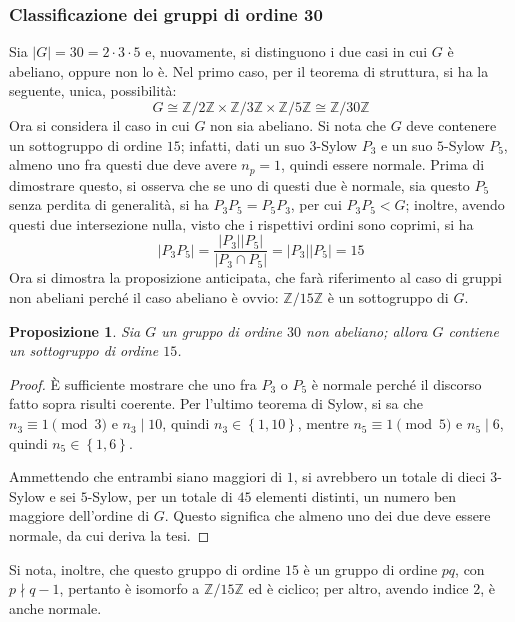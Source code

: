 \documentclass[11pt]{article}
\theoremstyle{style}
\newtheorem{prop}{Proposizione}[section]
\numberwithin{equation}{subsection}
\begin{document}
\subsubsection{Classificazione dei gruppi di ordine 30}
Sia $\lvert G \rvert  = 30 = 2\cdot 3\cdot 5$ e, nuovamente, si distinguono i due casi in cui $G$ \`e abeliano, oppure non lo \`e.
Nel primo caso, per il teorema di struttura, si ha la seguente, unica, possibilit\`a:
\[
G \cong \mathbb{Z}/2\mathbb{Z}\times  \mathbb{Z}/3\mathbb{Z}\times \mathbb{Z}/5\mathbb{Z} \cong \mathbb{Z}/30\mathbb{Z}
\] 
Ora si considera il caso in cui $G$ non sia abeliano.
Si nota che $G$ deve contenere un sottogruppo di ordine $15$; infatti, dati un suo $3$-Sylow $P_3$ e un suo $5$-Sylow $P_5$, almeno uno fra questi due deve avere $n_p =1$, quindi essere normale.
Prima di dimostrare questo, si osserva che se uno di questi due \`e normale, sia questo $P_5$ senza perdita di generalit\`a, si ha $P_3P_5=P_5P_3$, per cui $P_3P_5 < G$; inoltre, avendo questi due intersezione nulla, visto che i rispettivi ordini sono coprimi, si ha 
\[
\lvert P_3P_5 \rvert = \frac{\lvert P_3 \rvert \lvert P_5 \rvert }{\lvert P_3\cap P_5 \rvert } = \lvert P_3 \rvert \lvert P_5 \rvert =15
\] 
Ora si dimostra la proposizione anticipata, che far\`a riferimento al caso di gruppi non abeliani perch\'e il caso abeliano \`e ovvio: $\mathbb{Z}/15\mathbb{Z}$ \`e un sottogruppo di $G$.
\begin{prop}
	Sia $G$ un gruppo di ordine $30$ non abeliano; allora $G$ contiene un sottogruppo di ordine $15$.
\end{prop}
	\begin{proof}
		\`E sufficiente mostrare che uno fra $P_3$ o $P_5$ \`e normale perch\'e il discorso fatto sopra risulti coerente.
		Per l'ultimo teorema di Sylow, si sa che $n_3 \equiv 1 \pmod{3} $ e $n_3  \mid 10$, quindi $n_3 \in \left\{ 1,10 \right\} $, mentre $n_5 \equiv 1 \pmod{5} $ e $n_5  \mid 6$, quindi $n_5 \in \left\{ 1,6 \right\} $.

		Ammettendo che entrambi siano maggiori di $1$, si avrebbero un totale di dieci $3$-Sylow e sei $5$-Sylow, per un totale di $45$ elementi distinti, un numero ben maggiore dell'ordine di $G$.
		Questo significa che almeno uno dei due deve essere normale, da cui deriva la tesi.
	\end{proof}
\noindent Si nota, inoltre, che questo gruppo di ordine $15$ \`e un gruppo di ordine $pq$, con $p \nmid q-1$, pertanto \`e isomorfo a $\mathbb{Z}/15\mathbb{Z}$ ed \`e ciclico; per altro, avendo indice $2$, \`e anche normale.
\end{document}
